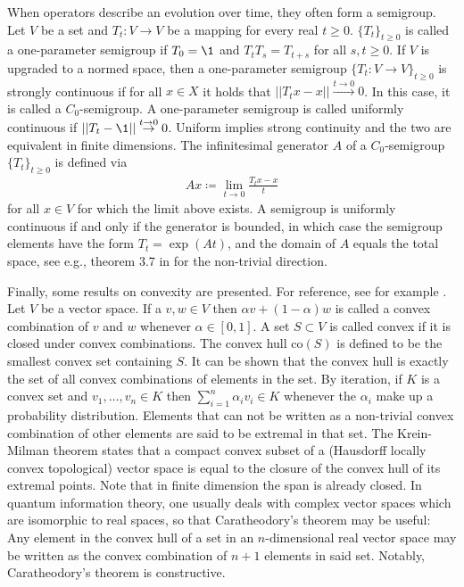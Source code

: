 When operators describe an evolution over time, they often form a semigroup. Let $V$ be a set and $T_t: V \rightarrow V$ be a mapping for every real $t\geq 0$. $\{T_t\}_{t\geq 0}$ is called a one-parameter semigroup if $T_0 = \1$ and $T_t T_s = T_{t+s}$ for all $s,t \geq0 $. If $V$ is upgraded to a normed space, then a one-parameter semigroup $\{T_t:V\rightarrow V\}_{t\geq 0}$ is strongly continuous if for all $x \in X$ it holds that $\vert \vert T_tx-x\vert\vert \overset{t \rightarrow 0}{\rightarrow} 0$. In this case, it is called a $C_0$-semigroup. A one-parameter semigroup is called uniformly continuous if $\vert \vert T_t - \1\vert \vert \overset{t \rightarrow 0}{\rightarrow} 0$. Uniform implies strong continuity and the two are equivalent in finite dimensions. The infinitesimal generator $A$ of a $C_0$-semigroup $\{T_t\}_{t\geq 0}$ is defined via
\begin{align}
    Ax \coloneqq \lim_{t \rightarrow 0}\frac{T_t x - x}{t}
\end{align}
for all $x \in V$ for which the limit above exists. A semigroup is uniformly continuous if and only if the generator is bounded, in which case the semigroup elements have the form $T_t = \exp(At)$, and the domain of $A$ equals the total space, see e.g., theorem 3.7 in \cite{semigroups} for the non-trivial direction.

Finally, some results on convexity are presented. For reference, see for example \cite{convex}. Let $V$ be a vector space. If a $v,w \in V$ then $\alpha v+(1-\alpha)w$ is called a convex combination of $v$ and $w$ whenever $\alpha \in [0,1]$. A set $S \subset V$ is called convex if it is closed under convex combinations. The convex hull $\text{co}(S)$ is defined to be the smallest convex set containing $S$. It can be shown that the convex hull is exactly the set of all convex combinations of elements in the set. By iteration, if $K$ is a convex set and $v_1, \dots, v_n \in K$ then $\sum_{i=1}^n \alpha_i v_i  \in K$ whenever the $\alpha_i$ make up a probability distribution. Elements that can not be written as a non-trivial convex combination of other elements are said to be extremal in that set. The Krein-Milman theorem states that a compact convex subset of a (Hausdorff locally convex topological) vector space is equal to the closure of the convex hull of its extremal points. Note that in finite dimension the span is already closed. In quantum information theory, one usually deals with complex vector spaces which are isomorphic to real spaces, so that Caratheodory's theorem may be useful: Any element in the convex hull of a set in an $n$-dimensional real vector space may be written as the convex combination of $n+1$ elements in said set. Notably, Caratheodory's theorem is constructive. 

